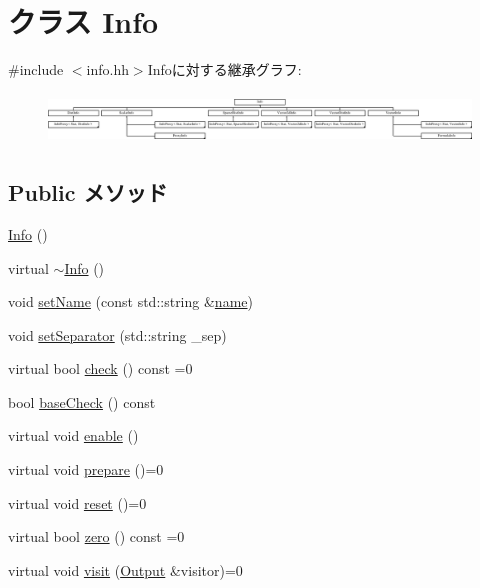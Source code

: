 \hypertarget{classStats_1_1Info}{
\section{クラス Info}
\label{classStats_1_1Info}
}


{\ttfamily \#include $<$info.hh$>$}Infoに対する継承グラフ:\begin{figure}[H]
\begin{center}
\leavevmode
\includegraphics[height=1.33333cm]{classStats_1_1Info}
\end{center}
\end{figure}
\subsection*{Public メソッド}
\begin{DoxyCompactItemize}
\item 
\hyperlink{classStats_1_1Info_ab548dec0fbc3c58026e3030d145bc64e}{Info} ()
\item 
virtual \hyperlink{classStats_1_1Info_a7552503ba27784c3c9d1b16c1ae042f9}{$\sim$Info} ()
\item 
void \hyperlink{classStats_1_1Info_a9d3a2685df23b5e7cbf59c19c4a1f9b5}{setName} (const std::string \&\hyperlink{classStats_1_1Info_a9b45b3e13bd9167aab02e17e08916231}{name})
\item 
void \hyperlink{classStats_1_1Info_a4d6e1ca4231c7f60458b9ba2545f534f}{setSeparator} (std::string \_\-sep)
\item 
virtual bool \hyperlink{classStats_1_1Info_a8eeec53c51bc14f0ad0fe9e545a7a154}{check} () const =0
\item 
bool \hyperlink{classStats_1_1Info_ac21d6db5b2d000383b434afba91be74b}{baseCheck} () const 
\item 
virtual void \hyperlink{classStats_1_1Info_a486f22824bd83c5308a0d70ffac6f758}{enable} ()
\item 
virtual void \hyperlink{classStats_1_1Info_a6516a60ee54e48d9e1f5565c0b8fda5a}{prepare} ()=0
\item 
virtual void \hyperlink{classStats_1_1Info_a20dcbdfbd0ec77afc802522bb7e379c1}{reset} ()=0
\item 
virtual bool \hyperlink{classStats_1_1Info_a3dfb6e014cb026189ed2317aba5700b2}{zero} () const =0
\item 
virtual void \hyperlink{classStats_1_1Info_a98d7011c51fa7058e7812bafc913f69a}{visit} (\hyperlink{structStats_1_1Output}{Output} \&visitor)=0
\end{DoxyCompactItemize}
